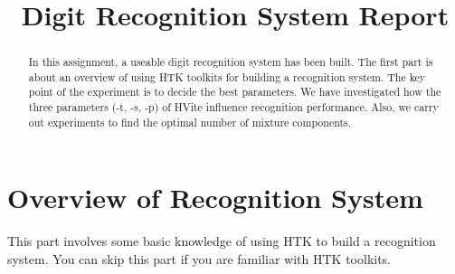 \documentclass{article}
\title{Digit Recognition System Report}
\begin{document}
\maketitle
\begin{abstract}
	In this assignment, a useable digit recognition system has been built. The first part is about an overview of using HTK toolkits for building a recognition system. The key point of the experiment is to decide the best parameters. We have investigated how the three parameters (-t, -s, -p) of HVite influence recognition performance. Also, we carry out experiments to find the optimal number of mixture components.
\end{abstract}

\section{Overview of 	Recognition System}
	This part involves some basic knowledge of using HTK to build a recognition system. You can skip this part if you are familiar with HTK toolkits.   	
\end{document}
